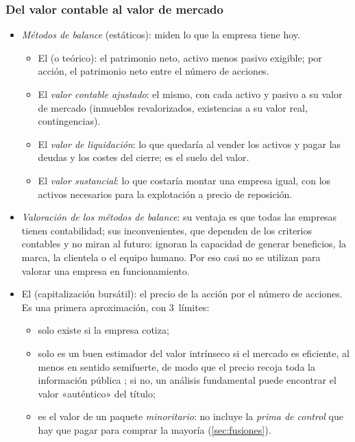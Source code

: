 \documentclass[11pt]{article}
\begin{document}
\subsubsection{Del valor contable al valor de mercado}\label{sec:valor-contable}

\begin{itemize}
\item \emph{Métodos de balance} (estáticos): miden lo que la empresa tiene hoy\nocite{Fernandez2008Metodos}.
  \begin{itemize}
  \item El  (o teórico): el patrimonio neto, activo menos pasivo exigible; por acción, el patrimonio neto entre el número de acciones.
  \item El \emph{valor contable ajustado}: el mismo, con cada activo y pasivo a su valor de mercado (inmuebles revalorizados, existencias a su valor real, contingencias).
  \item El \emph{valor de liquidación}: lo que quedaría al vender los activos y pagar las deudas y los costes del cierre; es el suelo del valor.
  \item El \emph{valor sustancial}: lo que costaría montar una empresa igual, con los activos necesarios para la explotación a precio de reposición.
  \end{itemize}
\item \emph{Valoración de los métodos de balance}: su ventaja es que todas las empresas tienen contabilidad; sus inconvenientes, que dependen de los criterios contables y no miran al futuro: ignoran la capacidad de generar beneficios, la marca, la clientela o el equipo humano. Por eso casi no se utilizan para valorar una empresa en funcionamiento.
\item El  (capitalización bursátil): el precio de la acción por el número de acciones. Es una primera aproximación, con 3~límites:
  \begin{itemize}
  \item solo existe si la empresa cotiza;
  \item solo es un buen estimador del valor intrínseco si el mercado es eficiente, al menos en sentido semifuerte, de modo que el precio recoja toda la información pública ; si no, un análisis fundamental puede encontrar el valor «auténtico» del título;
  \item es el valor de un paquete \emph{minoritario}: no incluye la \emph{prima de control} que hay que pagar para comprar la mayoría (\ref{sec:fusiones}).

\end{itemize}
\end{itemize}
\end{document}
